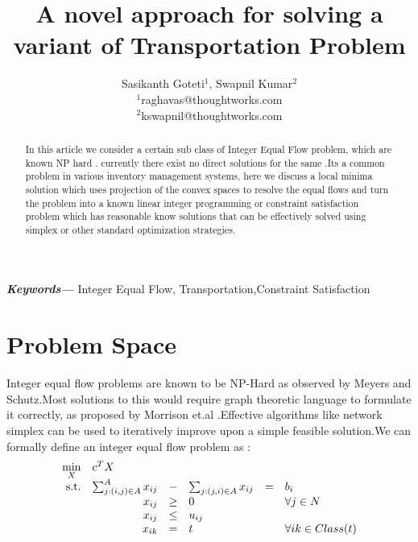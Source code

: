 \documentclass[a4paper]{article}
\title{A novel approach for solving a variant of Transportation Problem}
\author{Sasikanth Goteti$^{1}$, Swapnil Kumar$^{2}$  \\
            \small $^{1}$raghavas@thoughtworks.com \\
            \small $^{2}$kswapnil@thoughtworks.com \\
    }
\date{} %
\providecommand{\keywords}[1]
    {
      \small	
      \textbf{\textit{Keywords---}} #1
    }
\begin{document}
    \maketitle
    
    \begin{abstract}
        In this article we consider a certain sub class of Integer Equal Flow problem, which are known NP hard \cite{meyers}. 
        currently there exist no direct solutions for the same .Its a common problem in various inventory management systems,
        here we discuss a local minima solution which uses projection of the convex spaces to resolve the equal flows and turn 
        the problem into a known linear integer programming or constraint satisfaction problem which has reasonable know solutions that can be 
        effectively solved using simplex or other standard optimization strategies.
       \end{abstract}
    \keywords{Integer Equal Flow, Transportation,Constraint Satisfaction}
     
    \maketitle
    
    \section{Problem Space}
    Integer equal flow problems are known to be NP-Hard as observed by Meyers and Schutz\cite{meyers}.Most solutions to this would
    require graph theoretic language to formulate it correctly, as proposed by Morrison et.al \cite{Morrison2013ANS}.Effective
    algorithms like network simplex can be used to iteratively improve upon a simple feasible solution.We can formally define an
    integer equal flow problem as :
    \begin{equation}
        \begin{array}{rrclcl}
        \displaystyle \min_{X} & \multicolumn{3}{l}{c^T X} \\
        \textrm{s.t.} & \sum_{j:(i,j) \in A }^A x_{ij} & - & \sum_{j:(j,i) \in A } x_{ij} & = & b_i \\
        & x_{ij} & \geq & 0 & & \forall j \in N \\
        & x_{ij} & \leq & u_{ij} \\
        & x_{ik} &= & t && \forall {ik}\in Class(t)
        \end{array}
        \end{equation}
\end{document}
